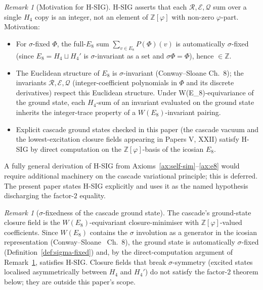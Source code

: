 \documentclass[12pt]{article}
\theoremstyle{definition}
\theoremstyle{remark}
\newtheorem{remark}[theorem]{Remark}
\newcommand{\Zphi}{\mathbb{Z}[\varphi]}
\begin{document}
\begin{remark}[Motivation for H-SIG]\label{rem:HSIG-motivation}
H-SIG asserts that each $\mathcal R, \mathcal E, \mathcal Q$ sum over a single $H_4$ copy is an integer, not an element of $\Zphi$ with non-zero $\varphi$-part. Motivation:
\begin{itemize}
\item For $\sigma$-fixed $\Phi$, the full-$E_8$ sum $\sum_{v \in E_8} P(\Phi)(v)$ is automatically $\sigma$-fixed (since $E_8 = H_4 \sqcup H_4'$ is $\sigma$-invariant as a set and $\sigma\Phi = \Phi$), hence $\in \mathbb{Z}$.
\item The Euclidean structure of $E_8$ is $\sigma$-invariant (Conway--Sloane Ch.~8); the invariants $\mathcal R, \mathcal E, \mathcal Q$ (integer-coefficient polynomials in $\Phi$ and its discrete derivatives) respect this Euclidean structure. Under W(E_8)-equivariance of the ground state, each $H_4$-sum of an invariant evaluated on the ground state inherits the integer-trace property of a $W(E_8)$-invariant pairing.
\item Explicit cascade ground states checked in this paper (the cascade vacuum and the lowest-excitation closure fields appearing in Papers V, XXII) satisfy H-SIG by direct computation on the $\Zphi$-basis of the icosian $E_8$.
\end{itemize}
A fully general derivation of H-SIG from Axioms~\ref{ax:self-sim}--\ref{ax:e8} would require additional machinery on the cascade variational principle; this is deferred. The present paper states H-SIG explicitly and uses it as the named hypothesis discharging the factor-$2$ equality.
\end{remark}

\begin{remark}[$\sigma$-fixedness of the cascade ground state]\label{rem:sigma-fixed-ground-disc}
The cascade's ground-state closure field is the $W(E_8)$-equivariant closure-minimiser with $\Zphi$-valued coefficients. Since $W(E_8)$ contains the $\sigma$ involution as a generator in the icosian representation (Conway--Sloane~\citep{ConwaySloane1999} Ch.~8), the ground state is automatically $\sigma$-fixed (Definition~\ref{def:sigma-fixed}) and, by the direct-computation argument of Remark~\ref{rem:HSIG-motivation}, satisfies H-SIG. Closure fields that break $\sigma$-symmetry (excited states localised asymmetrically between $H_4$ and $H_4'$) do not satisfy the factor-$2$ theorem below; they are outside this paper's scope.
\end{remark}
\end{document}
